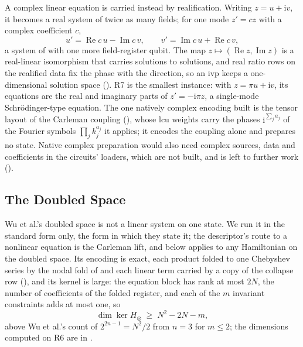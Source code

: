 A complex linear equation is carried instead by realification. Writing $z=u+\mathrm{i}v$, it becomes a real system of twice as many fields; for one mode $z'=cz$ with a complex coefficient $c$,
\begin{equation}
    u'=\operatorname{Re}c\,u-\operatorname{Im}c\,v,
    \qquad
    v'=\operatorname{Im}c\,u+\operatorname{Re}c\,v,
    \label{eq:realification}
\end{equation}
a system of  with one more field-register qubit. The map $z\mapsto(\operatorname{Re}z,\operatorname{Im}z)$ is a real-linear isomorphism that carries solutions to solutions, and real ratio rows on the realified data fix the phase with the direction, so an \gls{ivp} keeps a one-dimensional solution space (). R7 is the smallest instance: with $z=\pi u+\mathrm{i}v$, its equations are the real and imaginary parts of $z'=-\mathrm{i}\pi z$, a single-mode Schr\"odinger-type equation. The one natively complex encoding built is the tensor layout of the Carleman coupling (), whose \gls{lcu} weights carry the phases $\mathrm{i}^{\sum_ja_j}$ of the Fourier symbols $\prod_jk_j^{a_j}$ it applies; it encodes the coupling alone and prepares no state. Native complex preparation would also need complex sources, data and coefficients in the circuits' loaders, which are not built, and is left to further work ().

\subsection{The Doubled Space}
\label{sec:doubled-space}

Wu et al.'s doubled space is not a linear system on one state. We run it in the standard form only, the form in which they state it; the descriptor's route to a nonlinear equation is the Carleman lift, and  below applies to any Hamiltonian on the doubled space. Its encoding is exact, each product folded to one Chebyshev series by the nodal fold of  and each linear term carried by a copy of the collapse row (), and its kernel is large: the equation block has rank at most $2N$, the number of coefficients of the folded register, and each of the $m$ invariant constraints adds at most one, so
\begin{equation}
    \dim\ker H_\otimes \;\ge\; N^2-2N-m,
    \label{eq:doubled-kernel}
\end{equation}
above Wu et al.'s count of $2^{2n-1}=N^2/2$ from $n=3$ for $m\le2$; the dimensions computed on R6 are in .

